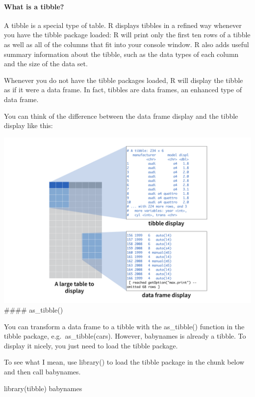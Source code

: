 \documentclass[
]{article}
\newenvironment{Shaded}{\begin{snugshade}}{\end{snugshade}}
\newcommand{\FunctionTok}[1]{\textcolor[rgb]{0.00,0.00,0.00}{#1}}
\newcommand{\NormalTok}[1]{#1}
\begin{document}
\hypertarget{what-is-a-tibble}{%
\paragraph{What is a tibble?}\label{what-is-a-tibble}}

A tibble is a special type of table. R displays tibbles in a refined way
whenever you have the tibble package loaded: R will print only the first
ten rows of a tibble as well as all of the columns that fit into your
console window. R also adds useful summary information about the tibble,
such as the data types of each column and the size of the data set.

Whenever you do not have the tibble packages loaded, R will display the
tibble as if it were a data frame. In fact, tibbles are data frames, an
enhanced type of data frame.

You can think of the difference between the data frame display and the
tibble display like this:

\includegraphics{./data/tibble_display.png} \#\#\#\# as\_tibble()

You can transform a data frame to a tibble with the as\_tibble()
function in the tibble package, e.g.~as\_tibble(cars). However,
babynames is already a tibble. To display it nicely, you just need to
load the tibble package.

To see what I mean, use library() to load the tibble package in the
chunk below and then call babynames.

\begin{Shaded}
\begin{Highlighting}[]
\FunctionTok{library}\NormalTok{(tibble)}
\NormalTok{babynames}
\end{Highlighting}
\end{Shaded}
\end{document}
